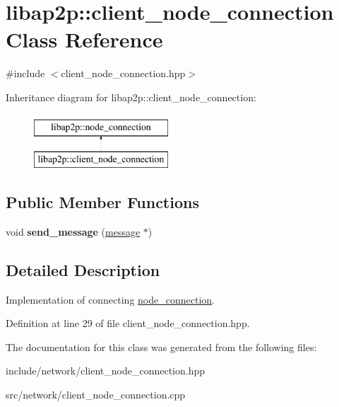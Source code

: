 \hypertarget{classlibap2p_1_1client__node__connection}{\section{libap2p\-:\-:client\-\_\-node\-\_\-connection Class Reference}
\label{classlibap2p_1_1client__node__connection}
}


{\ttfamily \#include $<$client\-\_\-node\-\_\-connection.\-hpp$>$}

Inheritance diagram for libap2p\-:\-:client\-\_\-node\-\_\-connection\-:\begin{figure}[H]
\begin{center}
\leavevmode
\includegraphics[height=2.000000cm]{classlibap2p_1_1client__node__connection}
\end{center}
\end{figure}
\subsection*{Public Member Functions}
\begin{DoxyCompactItemize}
\item 
\hypertarget{classlibap2p_1_1client__node__connection_a3e31f5b91ba46cb53521506d2a039293}{void {\bfseries send\-\_\-message} (\hyperlink{classlibap2p_1_1message}{message} $\ast$)}\label{classlibap2p_1_1client__node__connection_a3e31f5b91ba46cb53521506d2a039293}

\end{DoxyCompactItemize}


\subsection{Detailed Description}
Implementation of connecting \hyperlink{classlibap2p_1_1node__connection}{node\-\_\-connection}. 

Definition at line 29 of file client\-\_\-node\-\_\-connection.\-hpp.



The documentation for this class was generated from the following files\-:\begin{DoxyCompactItemize}
\item 
include/network/client\-\_\-node\-\_\-connection.\-hpp\item 
src/network/client\-\_\-node\-\_\-connection.\-cpp\end{DoxyCompactItemize}

